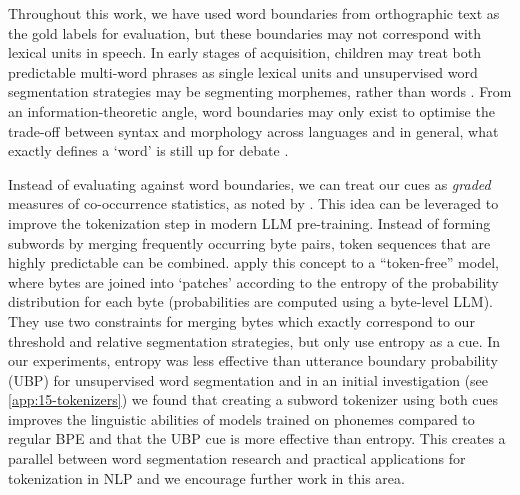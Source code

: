 
Throughout this work, we have used word boundaries from orthographic text as the gold labels for evaluation, but these boundaries may not correspond with lexical units in speech. In early stages of acquisition, children may treat both predictable multi-word phrases as single lexical units \citep{macwhinney1978} and unsupervised word segmentation strategies may be segmenting morphemes, rather than words \citep{fleck2008lexicalized}. From an information-theoretic angle, word boundaries may only exist to optimise the trade-off between syntax and morphology across languages \citep{koplenig2017statistical, mosteiro2025word} and in general, what exactly defines a `word' is still up for debate \citep{dixon2002word, haspelmath2023defining}.  %

Instead of evaluating against word boundaries, we can treat our cues as \emph{graded} measures of co-occurrence statistics, as noted by \citet{elman-1990-finding}. This idea can be leveraged to improve the tokenization step in modern LLM pre-training. Instead of forming subwords by merging frequently occurring byte pairs, token sequences that are highly predictable can be combined. \citet{pagnoni2024byte} apply this concept to a ``token-free'' model, where bytes are joined into `patches' according to the entropy of the probability distribution for each byte (probabilities are computed using a byte-level LLM). They use two constraints for merging bytes which exactly correspond to our threshold and relative segmentation strategies, but only use entropy as a cue. In our experiments, entropy was less effective than utterance boundary probability (UBP) for unsupervised word segmentation and in an initial investigation (see \cref{app:15-tokenizers}) we found that creating a subword tokenizer using both cues improves the linguistic abilities of models trained on phonemes compared to regular BPE and that the UBP cue is more effective than entropy. This creates a parallel between word segmentation research and practical applications for tokenization in NLP and we encourage further work in this area.




